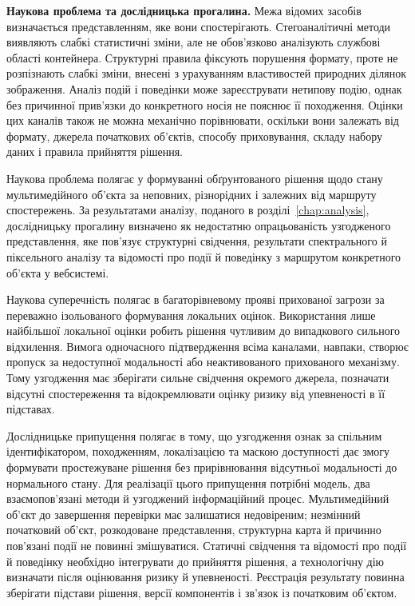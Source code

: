 \textbf{Наукова проблема та дослідницька прогалина.}
Межа відомих засобів визначається представленням, яке вони спостерігають. Стегоаналітичні методи виявляють слабкі статистичні зміни, але не обов’язково аналізують службові області контейнера. Структурні правила фіксують порушення формату, проте не розпізнають слабкі зміни, внесені з урахуванням властивостей природних ділянок зображення. Аналіз подій і поведінки може зареєструвати нетипову подію, однак без причинної прив’язки до конкретного носія не пояснює її походження. Оцінки цих каналів також не можна механічно порівнювати, оскільки вони залежать від формату, джерела початкових об’єктів, способу приховування, складу набору даних і правила прийняття рішення.

Наукова проблема полягає у формуванні обґрунтованого рішення щодо стану мультимедійного об’єкта за неповних, різнорідних і залежних від маршруту спостережень. За результатами аналізу, поданого в розділі~\ref{chap:analysis}, дослідницьку прогалину визначено як недостатню опрацьованість узгодженого представлення, яке пов’язує структурні свідчення, результати спектрального й піксельного аналізу та відомості про події й поведінку з маршрутом конкретного об’єкта у вебсистемі.

Наукова суперечність полягає в багаторівневому прояві прихованої загрози за переважно ізольованого формування локальних оцінок. Використання лише найбільшої локальної оцінки робить рішення чутливим до випадкового сильного відхилення. Вимога одночасного підтвердження всіма каналами, навпаки, створює пропуск за недоступної модальності або неактивованого прихованого механізму. Тому узгодження має зберігати сильне свідчення окремого джерела, позначати відсутні спостереження та відокремлювати оцінку ризику від упевненості в її підставах.

Дослідницьке припущення полягає в тому, що узгодження ознак за спільним ідентифікатором, походженням, локалізацією та маскою доступності дає змогу формувати простежуване рішення без прирівнювання відсутньої модальності до нормального стану. Для реалізації цього припущення потрібні модель, два взаємопов’язані методи й узгоджений інформаційний процес. Мультимедійний об’єкт до завершення перевірки має залишатися недовіреним; незмінний початковий об’єкт, розкодоване представлення, структурна карта й причинно пов’язані події не повинні змішуватися. Статичні свідчення та відомості про події й поведінку необхідно інтегрувати до прийняття рішення, а технологічну дію визначати після оцінювання ризику й упевненості. Реєстрація результату повинна зберігати підстави рішення, версії компонентів і зв’язок із початковим об’єктом.

